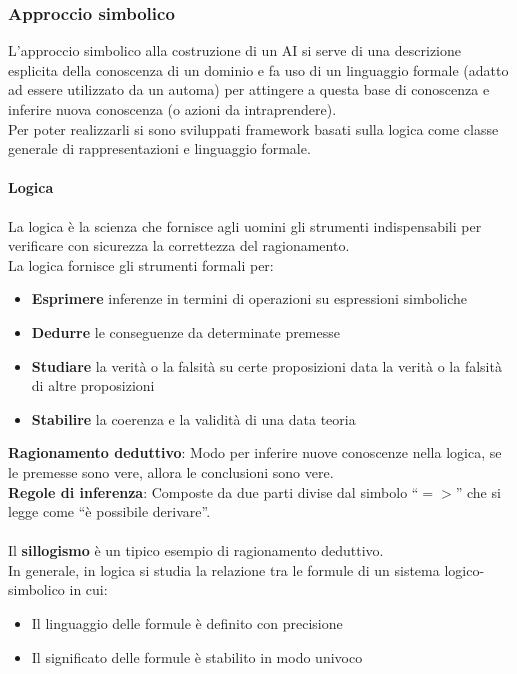 \documentclass[../main.tex]{subfiles}
\begin{document}
	\subsubsection{Approccio simbolico}
	L’approccio simbolico alla costruzione di un AI si serve di una descrizione esplicita della conoscenza di un dominio e fa uso di un linguaggio formale (adatto ad essere utilizzato da un automa) per attingere a questa base di conoscenza e inferire nuova conoscenza (o azioni da intraprendere).\\
	Per poter realizzarli si sono sviluppati framework basati sulla logica come classe generale di rappresentazioni e linguaggio formale.
	\paragraph{Logica}
	La logica è la scienza che fornisce agli uomini gli strumenti indispensabili per verificare con sicurezza la correttezza del ragionamento.\\
	La logica fornisce gli strumenti formali per:
	\begin{itemize}
		\item \textbf{Esprimere} inferenze in termini di operazioni su espressioni simboliche
		\item \textbf{Dedurre} le conseguenze da determinate premesse
		\item \textbf{Studiare} la verità o la falsità su certe proposizioni data la verità o la falsità di altre proposizioni
		\item \textbf{Stabilire} la coerenza e la validità di una data teoria
	\end{itemize}
	\textbf{Ragionamento deduttivo}: Modo per inferire nuove conoscenze nella logica, se le premesse sono vere, allora le conclusioni sono vere.\\
	\textbf{Regole di inferenza}: Composte da due parti divise dal simbolo “$=>$” che si legge come “è possibile derivare”. \\ \\
	Il \textbf{sillogismo} è un tipico esempio di ragionamento deduttivo. \\
	In generale, in logica si studia la relazione tra le formule di un sistema logico-simbolico in cui:
	\begin{itemize}
		\item Il linguaggio delle formule è definito con precisione
		\item Il significato delle formule è stabilito in modo univoco
	\end{itemize}
\end{document}
